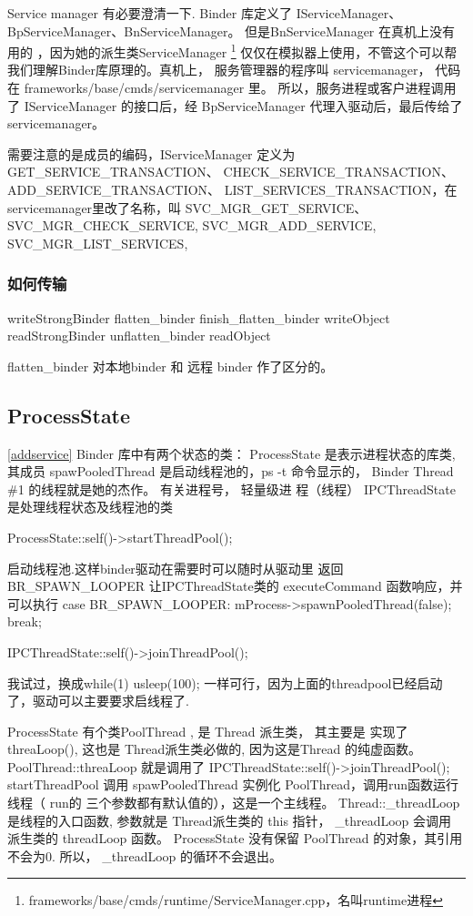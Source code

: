 \documentclass[a4paper,11pt]{article}
\begin{document}
    Service manager 有必要澄清一下. Binder 库定义了 IServiceManager、
    BpServiceManager、BnServiceManager。 但是BnServiceManager 在真机上没有用的
    ，因为她的派生类ServiceManager
    \footnote{frameworks/base/cmds/runtime/ServiceManager.cpp，名叫runtime进程}
    仅仅在模拟器上使用，不管这个可以帮我们理解Binder库原理的。真机上， 服务管理器的程序叫 servicemanager， 代码在 
    frameworks/base/cmds/servicemanager 里。 所以，服务进程或客户进程调用了
    IServiceManager 的接口后，经 BpServiceManager 代理入驱动后，最后传给了
    servicemanager。

    需要注意的是成员的编码，IServiceManager 定义为 GET_SERVICE_TRANSACTION、
    CHECK_SERVICE_TRANSACTION、ADD_SERVICE_TRANSACTION、
    LIST_SERVICES_TRANSACTION，在servicemanager里改了名称，叫
    SVC_MGR_GET_SERVICE、SVC_MGR_CHECK_SERVICE, SVC_MGR_ADD_SERVICE, SVC_MGR_LIST_SERVICES,

\subsubsection{如何传输}
writeStrongBinder flatten_binder finish_flatten_binder writeObject 
readStrongBinder unflatten_binder readObject


flatten_binder 对本地binder 和 远程 binder 作了区分的。
\subsection{ProcessState}
\ref{addservice}
Binder 库中有两个状态的类：
ProcessState 是表示进程状态的库类, 其成员 spawPooledThread 是启动线程池的，ps
-t 命令显示的， Binder Thread \#1 的线程就是她的杰作。 有关进程号， 轻量级进
程（线程）
IPCThreadState 是处理线程状态及线程池的类

ProcessState::self()->startThreadPool(); 

  启动线程池.这样binder驱动在需要时可以随时从驱动里
  返回 BR_SPAWN_LOOPER 让IPCThreadState类的
  executeCommand 函数响应，并可以执行
  case BR_SPAWN_LOOPER:
  mProcess->spawnPooledThread(false);
  break;


    IPCThreadState::self()->joinThreadPool();
    
    我试过，换成while(1) usleep(100); 一样可行，因为上面的threadpool已经启动
    了，驱动可以主要要求启线程了.

ProcessState 有个类PoolThread , 是 Thread 派生类， 其主要是 实现了
threaLoop(), 这也是 Thread派生类必做的, 因为这是Thread 的纯虚函数。
PoolThread::threaLoop 就是调用了  
    IPCThreadState::self()->joinThreadPool();
startThreadPool 调用 spawPooledThread  实例化 PoolThread，调用run函数运行线程（ run的
三个参数都有默认值的），这是一个主线程。
Thread::_threadLoop 是线程的入口函数, 参数就是 Thread派生类的 this 指针，
_threadLoop 会调用 派生类的 threadLoop 函数。 ProcessState 没有保留 PoolThread
的对象，其引用不会为0. 所以， _threadLoop 的循环不会退出。
\end{document}
